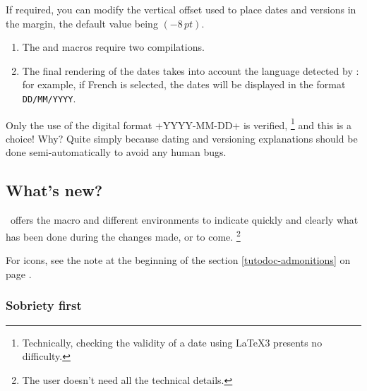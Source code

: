\begin{tdocexa}
	If required, you can modify the vertical offset used to place dates and versions in the margin, the default value being $(-8\,\mathit{pt})$.

\end{tdocexa}


\begin{tdocimp}
    \begin{enumerate}[wide]
        \item The  and  macros require two compilations.

        \item The final rendering of the dates takes into account the language detected by \thisproj{}: for example, if French is selected, the dates will be displayed in the format \texttt{DD/MM/YYYY}.
    \end{enumerate}
\end{tdocimp}


\begin{tdoccaut}
    Only the use of the digital format \tdoclatexin+YYYY-MM-DD+ is verified,%
    \footnote{
        Technically, checking the validity of a date using \LaTeX3 presents no difficulty.
    }
    and this is a choice! Why? Quite simply because dating and versioning explanations should be done semi-automatically to avoid any human bugs.
\end{tdoccaut}


\subsection{What's new?}

\thisproj\ offers the macro  and different environments to indicate quickly and clearly what has been done during the changes made, or to come.%
\footnote{
    The user doesn't need all the technical details.
}


\begin{tdocnote}
    For icons, see the note at the beginning of the section \ref{tutodoc-admonitions} on page \pageref{tutodoc-admonitions}.
\end{tdocnote}


\subsubsection{Sobriety first}

